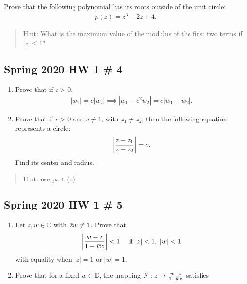 Prove that the following polynomial has its roots outside of the unit
circle:
\begin{align*}
p(z) = z^3 + 2z + 4
.\end{align*}

\begin{quote}
Hint: What is the maximum value of the modulus of the first two terms if
\({\left\lvert {z} \right\rvert} \leq 1\)?
\end{quote}

\hypertarget{spring-2020-hw-1-4}{%
\subsection{Spring 2020 HW 1 \# 4}\label{spring-2020-hw-1-4}}

\begin{enumerate}
\def\labelenumi{\alph{enumi}.}
\item
  Prove that if \(c>0\),
  \begin{align*}
  {\left\lvert {w_1} \right\rvert} = c{\left\lvert {w_2} \right\rvert} \implies {\left\lvert {w_1 - c^2 w_2} \right\rvert} = c{\left\lvert {w_1 - w_2} \right\rvert}
  .\end{align*}
\item
  Prove that if \(c>0\) and \(c\neq 1\), with \(z_1\neq z_2\), then the
  following equation represents a circle:
  \begin{align*}
  {\left\lvert {z-z_1 \over z-z_2} \right\rvert} = c
  .\end{align*}
  Find its center and radius.
\end{enumerate}

\begin{quote}
Hint: use part (a)
\end{quote}

\hypertarget{spring-2020-hw-1-5}{%
\subsection{Spring 2020 HW 1 \# 5}\label{spring-2020-hw-1-5}}

\begin{enumerate}
\def\labelenumi{\alph{enumi}.}
\item
  Let \(z, w \in {\mathbb{C}}\) with
  \(\mkern 1.5mu\overline{\mkern-1.5muz\mkern-1.5mu}\mkern 1.5mu w \neq 1\).
  Prove that
  \begin{align*}
  {\left\lvert {w-z \over 1 - \mkern 1.5mu\overline{\mkern-1.5muw\mkern-1.5mu}\mkern 1.5mu z} \right\rvert} < 1 \quad\text{ if } {\left\lvert {z} \right\rvert}<1,~ {\left\lvert {w} \right\rvert} < 1
  \end{align*}
  with equality when \({\left\lvert {z} \right\rvert} = 1\) or
  \({\left\lvert {w} \right\rvert} = 1\).
\item
  Prove that for a fixed \(w\in {\mathbb{D}}\), the mapping
  \(F: z\mapsto {w-z \over 1 - \mkern 1.5mu\overline{\mkern-1.5muw\mkern-1.5mu}\mkern 1.5mu z}\)
  satisfies
\end{enumerate}


